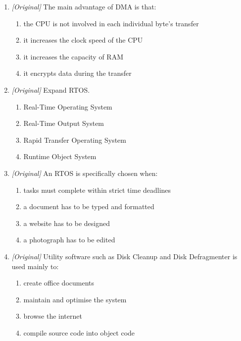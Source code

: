 \begin{enumerate}[label=\textbf{Q\arabic*.}, leftmargin=*]
\begin{enumerate}[label=\Alph*.]
    \item the CPU and the I/O device
    \item the I/O device and main memory
    \item cache and registers
    \item secondary storage and the CPU
  \end{enumerate}
\item \textit{[Original]} The main advantage of DMA is that:
  \begin{enumerate}[label=\Alph*.]
    \item the CPU is not involved in each individual byte's transfer
    \item it increases the clock speed of the CPU
    \item it increases the capacity of RAM
    \item it encrypts data during the transfer
  \end{enumerate}
\item \textit{[Original]} Expand RTOS.
  \begin{enumerate}[label=\Alph*.]
    \item Real-Time Operating System
    \item Real-Time Output System
    \item Rapid Transfer Operating System
    \item Runtime Object System
  \end{enumerate}
\item \textit{[Original]} An RTOS is specifically chosen when:
  \begin{enumerate}[label=\Alph*.]
    \item tasks must complete within strict time deadlines
    \item a document has to be typed and formatted
    \item a website has to be designed
    \item a photograph has to be edited
  \end{enumerate}
\item \textit{[Original]} Utility software such as Disk Cleanup and Disk
  Defragmenter is used mainly to:
  \begin{enumerate}[label=\Alph*.]
    \item create office documents
    \item maintain and optimise the system
    \item browse the internet
    \item compile source code into object code

\end{enumerate}
\end{enumerate}
